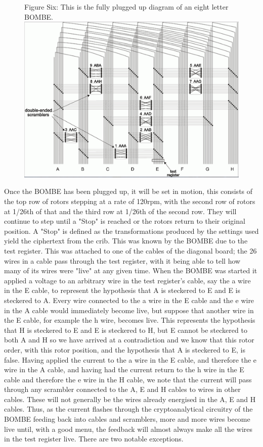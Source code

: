 \documentclass[12pt,a4paper]{article}
\begin{document}
\begin{figure}[H]
\centering
Figure Six: 
This is the fully plugged up diagram of an eight letter BOMBE.
\includegraphics[width=\textwidth]{BOMBEthree.png}
\end{figure}

Once the BOMBE has been plugged up, it will be set in motion, this consists of the top row of rotors stepping at a rate of 120rpm, with the second row of rotors at 1/26th of that and the third row at 1/26th of the second row. They will continue to step until a "Stop" is reached or the rotors return to their original position. A "Stop" is defined as the transformations produced by the settings used yield the ciphertext from the crib. This was known by the BOMBE due to the test register. This was attached to one of the cables of the diagonal board; the 26 wires in a cable pass through the test register, with it being able to tell how many of its wires were "live" at any given time. When the BOMBE was started it applied a voltage to an arbitrary wire in the test register's cable, say the a wire in the E cable, to represent the hypothesis that A is steckered to E and E is steckered to A. Every wire connected to the a wire in the E cable and the e wire in the A cable would immediately become live, but suppose that another wire in the E cable, for example the h wire, becomes live. This represents the hypothesis that H is steckered to E and E is steckered to H, but E cannot be steckered to both A and H so we have arrived at a contradiction and we know that this rotor order, with this rotor position, and the hypothesis that A is steckered to E, is false. Having applied the current to the a wire in the E cable, and therefore the e wire in the A cable, and having had the current return to the h wire in the E cable and therefore the e wire in the H cable, we note that the current will pass through any scrambler connected to the A, E and H cables to wires in other cables. These will not generally be the wires already energised in the A, E and H cables. Thus, as the current flashes through the cryptoanalytical circuitry of the BOMBE feeding back into cables and scramblers, more and more wires become live until, with a good menu, the feedback will almost always make all the wires in the test register live. There are two notable exceptions.
\end{document}
